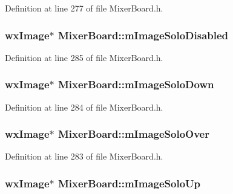 Definition at line 277 of file Mixer\+Board.\+h.

\subsubsection[{\texorpdfstring{m\+Image\+Solo\+Disabled}{mImageSoloDisabled}}]{\setlength{\rightskip}{0pt plus 5cm}wx\+Image$\ast$ Mixer\+Board\+::m\+Image\+Solo\+Disabled}\hypertarget{class_mixer_board_a866c6b6aae90c8dbf4722a2f20b3440a}{}\label{class_mixer_board_a866c6b6aae90c8dbf4722a2f20b3440a}


Definition at line 285 of file Mixer\+Board.\+h.

\subsubsection[{\texorpdfstring{m\+Image\+Solo\+Down}{mImageSoloDown}}]{\setlength{\rightskip}{0pt plus 5cm}wx\+Image$\ast$ Mixer\+Board\+::m\+Image\+Solo\+Down}\hypertarget{class_mixer_board_a127f82e91f5167ec87ff9e8484000a14}{}\label{class_mixer_board_a127f82e91f5167ec87ff9e8484000a14}


Definition at line 284 of file Mixer\+Board.\+h.

\subsubsection[{\texorpdfstring{m\+Image\+Solo\+Over}{mImageSoloOver}}]{\setlength{\rightskip}{0pt plus 5cm}wx\+Image$\ast$ Mixer\+Board\+::m\+Image\+Solo\+Over}\hypertarget{class_mixer_board_ac47db27c391c399a618dc4b29331bc0f}{}\label{class_mixer_board_ac47db27c391c399a618dc4b29331bc0f}


Definition at line 283 of file Mixer\+Board.\+h.

\subsubsection[{\texorpdfstring{m\+Image\+Solo\+Up}{mImageSoloUp}}]{\setlength{\rightskip}{0pt plus 5cm}wx\+Image$\ast$ Mixer\+Board\+::m\+Image\+Solo\+Up}\hypertarget{class_mixer_board_aff0be038cf0ba7eaec8274eea4a94fdb}{}\label{class_mixer_board_aff0be038cf0ba7eaec8274eea4a94fdb}


